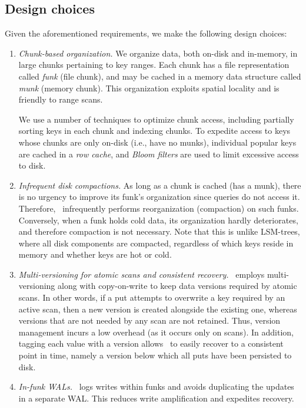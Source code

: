 \subsection{Design choices}

Given the aforementioned requirements, we make the following design choices:

\begin{enumerate}\itemsep0pt
\item \emph{Chunk-based organization.}
We organize data, both on-disk and in-memory,  in large chunks pertaining to  key ranges.  
Each chunk has a file representation called  \emph{funk} (file chunk), and may be cached in a  memory data structure called \emph{munk} (memory chunk).
This organization exploits spatial locality and is friendly to range scans.

We use a number of techniques to optimize chunk  access, including partially sorting keys in each chunk and 
indexing chunks. 
To expedite access to  keys whose chunks are only on-disk  (i.e., have no munks), 
individual popular keys are cached in a \emph{row cache}, 
and \emph{Bloom filters} are used to limit excessive access to disk. 

\item \emph{Infrequent disk compactions.}
As long as a chunk is cached (has a munk), there is no urgency to improve its funk's organization since 
queries do not access it. Therefore, \sys\ infrequently performs reorganization (compaction) on such funks.
Conversely, when a funk holds cold data, its organization hardly deteriorates, and therefore compaction is not necessary.
Note that this is unlike LSM-trees, where all disk components are compacted, regardless of which keys reside in memory and whether 
keys are hot or cold. 

\item \emph{Multi-versioning for atomic scans and consistent recovery.}
\sys\ employs multi-versioning along with
copy-on-write to keep data versions required by atomic scans. 
In other words, if a put attempts to overwrite a key required by an active scan, then a new version is created alongside the 
existing one, whereas versions that are not needed by any scan are not retained. 
Thus, version management incurs a low overhead (as it occurs only on scans). 
In addition, tagging each value with a version allows \sys\ to easily recover to a consistent point in time, namely a version below which all puts have been persisted to disk.

\item \emph{In-funk WALs.}
\sys\ logs writes within funks and avoids duplicating the updates  in a separate WAL. This reduces write amplification and expedites recovery. 
\end{enumerate}
